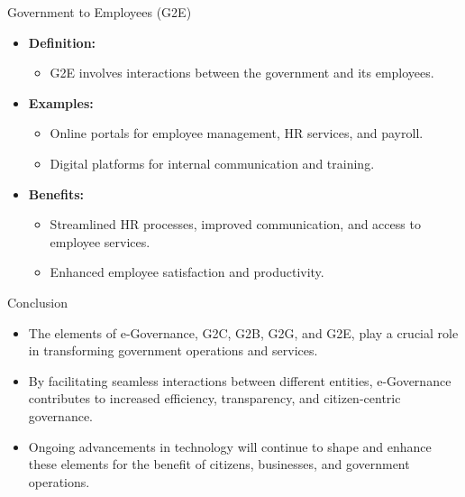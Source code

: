 \begin{frame}{Government to Employees (G2E)}
  \begin{itemize}
    \item \textbf{Definition:}
      \begin{itemize}
        \item G2E involves interactions between the government and its employees.
      \end{itemize}
    \item \textbf{Examples:}
      \begin{itemize}
        \item Online portals for employee management, HR services, and payroll.
        \item Digital platforms for internal communication and training.
      \end{itemize}
    \item \textbf{Benefits:}
      \begin{itemize}
        \item Streamlined HR processes, improved communication, and access to employee services.
        \item Enhanced employee satisfaction and productivity.
      \end{itemize}
  \end{itemize}
\end{frame}

\begin{frame}{Conclusion}
  \begin{itemize}
    \item The elements of e-Governance, G2C, G2B, G2G, and G2E, play a crucial role in transforming government operations and services.
    \item By facilitating seamless interactions between different entities, e-Governance contributes to increased efficiency, transparency, and citizen-centric governance.
    \item Ongoing advancements in technology will continue to shape and enhance these elements for the benefit of citizens, businesses, and government operations.
  \end{itemize}
\end{frame}
